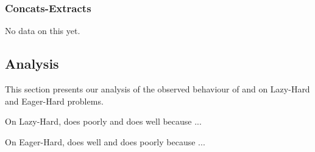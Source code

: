 
        \subsubsection{Concats-Extracts}

            No data on this yet.

    \subsection{Analysis}

        This section presents our analysis of the observed behaviour of \cvc{} and \us{} on Lazy-Hard and Eager-Hard problems.

        On Lazy-Hard, \cvc{} does poorly and \us{} does well because ...

        On Eager-Hard, \cvc{} does well and \us{} does poorly because ...
